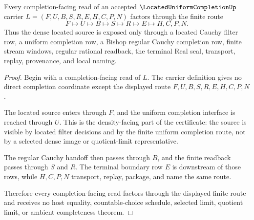 \begin{theorem}\label{thm:located-uniform-completion-density-route}
Every completion-facing read of an accepted $\LocatedUniformCompletionUp$ carrier $L=(F,U,B,S,R,E,H,C,P,N)$ factors through the finite route
$$
F \longmapsto U \longmapsto B \longmapsto S \longmapsto R \longmapsto E \longmapsto H,C,P,N .
$$
Thus the dense located source is exposed only through a located Cauchy filter row, a uniform completion row, a Bishop regular Cauchy completion row, finite stream windows, regular rational readback, the terminal Real seal, transport, replay, provenance, and local naming.
\end{theorem}
\begin{proof}
Begin with a completion-facing read of $L$. The carrier definition gives no direct completion coordinate except the displayed route $F,U,B,S,R,E,H,C,P,N$.

The located source enters through $F$, and the uniform completion interface is reached through $U$. This is the density-facing part of the certificate: the source is visible by located filter decisions and by the finite uniform completion route, not by a selected dense image or quotient-limit representative.

The regular Cauchy handoff then passes through $B$, and the finite readback passes through $S$ and $R$. The terminal boundary row $E$ is downstream of those rows, while $H,C,P,N$ transport, replay, package, and name the same route.

Therefore every completion-facing read factors through the displayed finite route and receives no host equality, countable-choice schedule, selected limit, quotient limit, or ambient completeness theorem.
\end{proof}

